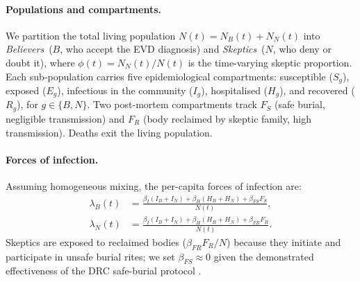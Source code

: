 \documentclass[12pt,a4paper]{article}
\newcommand{\IB}{I_{\!B}}\newcommand{\HB}{H_{\!B}}\newcommand{\RB}{R_{\!B}}
\newcommand{\IN}{I_{\!N}}\newcommand{\HN}{H_{\!N}}\newcommand{\RN}{R_{\!N}}
\newcommand{\lB}{\lambda_B}\newcommand{\lN}{\lambda_N}
\begin{document}
\paragraph{Populations and compartments.}
We partition the total living population $N(t) = N_B(t) + N_N(t)$ into
\emph{Believers}~($B$, who accept the EVD diagnosis) and
\emph{Skeptics}~($N$, who deny or doubt it), where
$\phi(t) = N_N(t)/N(t)$ is the time-varying skeptic proportion.
Each sub-population carries five epidemiological compartments: susceptible
($S_g$), exposed ($E_g$), infectious in the community ($I_g$),
hospitalised ($H_g$), and recovered ($R_g$), for $g \in \{B,N\}$.
Two post-mortem compartments track $F_S$ (safe burial, negligible
transmission) and $F_R$ (body reclaimed by skeptic family, high
transmission). Deaths exit the living population.

\paragraph{Forces of infection.}
Assuming homogeneous mixing, the per-capita forces of infection are:
\begin{align}
  \lB(t) &= \frac{\beta_I(\IB+\IN)
              + \beta_H(\HB+\HN)
              + \beta_{FS}F_S}{N(t)}, \label{eq:lambdaB}\\[4pt]
  \lN(t) &= \frac{\beta_I(\IB+\IN)
              + \beta_H(\HB+\HN)
              + \beta_{FR}F_R}{N(t)}. \label{eq:lambdaN}
\end{align}
Skeptics are exposed to reclaimed bodies ($\beta_{FR}F_R/N$) because they
initiate and participate in unsafe burial rites; we set $\beta_{FS}\approx0$
given the demonstrated effectiveness of the DRC safe-burial protocol
\citep{Coltart2017}.
\end{document}
